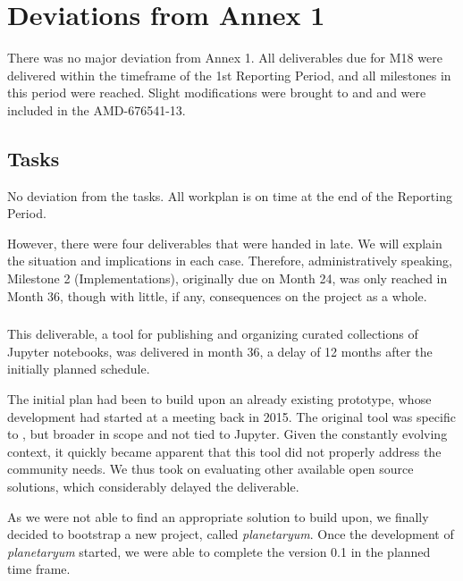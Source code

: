 \section{Deviations from Annex 1}

There was no major deviation from Annex 1. All deliverables due for M18 were delivered
  within the timeframe of the 1st Reporting Period, and all milestones in this period were
  reached.  Slight modifications were brought to  and  and were
  included in the AMD-676541-13.

\subsection{Tasks}

No deviation from the tasks. All workplan is on time at the end of the Reporting
Period.

However, there were four deliverables that
were handed in late. We will explain the situation and implications in
each case. Therefore, administratively speaking, Milestone 2
(Implementations), originally due on Month 24, was only reached in
Month 36, though with little, if any, consequences on the project as a
whole.

\subsubsection{\protect{}}
This deliverable, a tool for publishing and organizing curated
collections of Jupyter notebooks, was delivered in month 36, a delay
of 12 months after the initially planned schedule.

The initial plan had been to build upon an already existing prototype,
whose development had started at a \Sage meeting back in 2015. The
original tool was specific to \Sage, but broader in scope and not tied
to Jupyter. Given the constantly evolving context, it quickly became
apparent that this tool did not properly address the community needs.
We thus took on evaluating other available open source solutions,
which considerably delayed the deliverable.

As we were not able to find an appropriate solution to build upon, we
finally decided to bootstrap a new project, called
\emph{planetaryum}. Once the development of \emph{planetaryum}
started, we were able to complete the version 0.1 in the planned
time frame.

